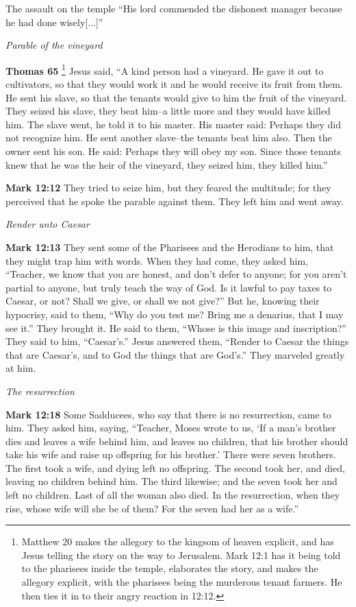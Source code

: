 \documentclass[10pt,twoside]{article} %
\newcommand{\quotesize}{\normalsize{}}
\newenvironment{quotetext}{\begingroup\quotesize}{\endgroup}
\newcommand{\bible}[2]{\begin{quotetext}\textbf{#1} #2\end{quotetext}}
\newcommand{\gospelmark}[2]{\bible{Mark #1}{#2}}
\newcommand{\thomas}[2]{\bible{Thomas #1}{#2}}
\newcommand{\subhead}[1]{\emph{#1}\par}
\begin{document}
\begin{section}{The assault on the temple}
{   ``His lord commended the dishonest manager because he had done wisely[...]''
}

\subhead{Parable of the vineyard}

\thomas{65}{\footnote{Matthew 20 makes the allegory to the kingsom of heaven explicit, and has Jesus telling the story on the way to Jerusalem.
Mark 12:1 has it being told to the pharisees inside the temple, 
elaborates the story, and makes the allegory explicit, with the pharisees being the murderous tenant farmers.
He then ties it in to their angry reaction in 12:12.}
Jesus said, ``A kind person had a vineyard. He gave it out to cultivators, so that
they would work it and he would receive its fruit from them. He sent
his slave, so that the tenants would give to him the fruit of the
vineyard. They seized his slave, they beat him--a little more and they
would have killed him. The slave went, he told it to his master. His
master said: Perhaps they did not recognize him. He sent another
slave--the tenants beat him also. Then the owner sent his son. He
said: Perhaps they will obey my son. Since those tenants knew that he
was the heir of the vineyard, they seized him, they killed
him.''
}

\gospelmark{12:12}{
 They tried to seize him, but they feared the multitude; for they perceived that he spoke the parable against them.
They left him and went away.
}

\subhead{Render unto Caesar}

\gospelmark{12:13}{
They sent some of the Pharisees and the Herodians to him, that they might trap him with words.   When they had come, they asked him, ``Teacher, we know that you are honest, and don't defer to anyone; for you aren't partial to anyone, but truly teach the way of God. Is it lawful to pay taxes to Caesar, or not?   Shall we give, or shall we not give?''
But he, knowing their hypocrisy, said to them, ``Why do you test me? Bring me a denarius, that I may see it.''
  They brought it.
He said to them, ``Whose is this image and inscription?''
They said to him, ``Caesar's.''
  Jesus answered them, ``Render to Caesar the things that are Caesar's, and to God the things that are God's.''
They marveled greatly at him. 
}

\subhead{The resurrection}

\gospelmark{12:18}{
Some Sadducees, who say that there is no resurrection, came to him. They asked him, saying,   ``Teacher, Moses wrote to us, `If a man's brother dies and leaves a wife behind him, and leaves no children, that his brother should take his wife and raise up offspring for his brother.'   There were seven brothers. The first took a wife, and dying left no offspring.   The second took her, and died, leaving no children behind him. The third likewise;   and the seven took her and left no children. Last of all the woman also died.   In the resurrection, when they rise, whose wife will she be of them? For the seven had her as a wife.''

}
\end{section}
\end{document}
